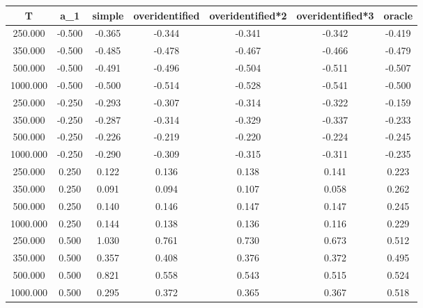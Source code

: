 % 
\begin{tabular}{ccccccc}
  \hline
T & a\_1 & simple & overidentified & overidentified*2 & overidentified*3 & oracle \\ 
  \hline
250.000 & -0.500 & -0.365 & -0.344 & -0.341 & -0.342 & -0.419 \\ 
  350.000 & -0.500 & -0.485 & -0.478 & -0.467 & -0.466 & -0.479 \\ 
  500.000 & -0.500 & -0.491 & -0.496 & -0.504 & -0.511 & -0.507 \\ 
  1000.000 & -0.500 & -0.500 & -0.514 & -0.528 & -0.541 & -0.500 \\ 
  250.000 & -0.250 & -0.293 & -0.307 & -0.314 & -0.322 & -0.159 \\ 
  350.000 & -0.250 & -0.287 & -0.314 & -0.329 & -0.337 & -0.233 \\ 
  500.000 & -0.250 & -0.226 & -0.219 & -0.220 & -0.224 & -0.245 \\ 
  1000.000 & -0.250 & -0.290 & -0.309 & -0.315 & -0.311 & -0.235 \\ 
  250.000 & 0.250 & 0.122 & 0.136 & 0.138 & 0.141 & 0.223 \\ 
  350.000 & 0.250 & 0.091 & 0.094 & 0.107 & 0.058 & 0.262 \\ 
  500.000 & 0.250 & 0.140 & 0.146 & 0.147 & 0.147 & 0.245 \\ 
  1000.000 & 0.250 & 0.144 & 0.138 & 0.136 & 0.116 & 0.229 \\ 
  250.000 & 0.500 & 1.030 & 0.761 & 0.730 & 0.673 & 0.512 \\ 
  350.000 & 0.500 & 0.357 & 0.408 & 0.376 & 0.372 & 0.495 \\ 
  500.000 & 0.500 & 0.821 & 0.558 & 0.543 & 0.515 & 0.524 \\ 
  1000.000 & 0.500 & 0.295 & 0.372 & 0.365 & 0.367 & 0.518 \\ 
   \hline
\end{tabular}
